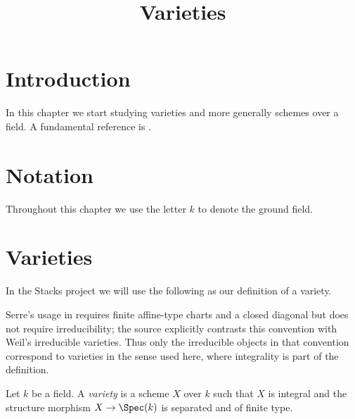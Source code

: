 

%


\title{Varieties}


\maketitle

\label{section-phantom}

\tableofcontents

\section{Introduction}
\label{section-introduction}

\noindent
In this chapter we start studying varieties and more generally
schemes over a field. A fundamental reference is \cite{EGA}.








\section{Notation}
\label{section-notation}

\noindent
Throughout this chapter we use the letter $k$ to denote the ground field.










\section{Varieties}
\label{section-varieties}

\noindent
In the Stacks project we will use the following as our definition
of a variety.

\begin{definition}
\label{definition-variety}
\begin{reference}
\cite[Chapter II, \S 1, no. 34, pp. 226--228]{FAC}
\end{reference}
\begin{history}
Serre's usage in \cite{FAC} requires finite affine-type charts and a closed
diagonal but does not require irreducibility; the source explicitly contrasts
this convention with Weil's irreducible varieties. Thus only the irreducible
objects in that convention correspond to varieties in the sense used here,
where integrality is part of the definition.
\end{history}
Let $k$ be a field. A {\it variety} is a scheme $X$ over $k$
such that $X$ is integral and the structure morphism
$X \to \Spec(k)$ is separated and of finite type.
\end{definition}

